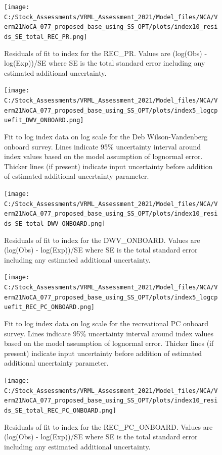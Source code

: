\documentclass[11pt,
  english,
  a4paper,
]{article}
\begin{document}
\begin{figure}
\centering
\texttt{[image: C:/Stock\_Assessments/VRML\_Assessment\_2021/Model\_files/NCA/Verm21NoCA\_077\_proposed\_base\_using\_SS\_OPT/plots/index10\_resids\_SE\_total\_REC\_PR.png]}
\caption{Residuals of fit to index for the REC\_PR. Values are (log(Obs) - log(Exp))/SE where SE is the total standard error including any estimated additional uncertainty.\label{fig:cpue-resid-REC-PR}}
\end{figure}

\begin{figure}
\centering
\texttt{[image: C:/Stock\_Assessments/VRML\_Assessment\_2021/Model\_files/NCA/Verm21NoCA\_077\_proposed\_base\_using\_SS\_OPT/plots/index5\_logcpuefit\_DWV\_ONBOARD.png]}
\caption{Fit to log index data on log scale for the Deb Wilson-Vandenberg onboard survey. Lines indicate 95\% uncertainty interval around index values based on the model assumption of lognormal error. Thicker lines (if present) indicate input uncertainty before addition of estimated additional uncertainty parameter.\label{fig:log-cpue-DWV-ONBOARD}}
\end{figure}

\begin{figure}
\centering
\texttt{[image: C:/Stock\_Assessments/VRML\_Assessment\_2021/Model\_files/NCA/Verm21NoCA\_077\_proposed\_base\_using\_SS\_OPT/plots/index10\_resids\_SE\_total\_DWV\_ONBOARD.png]}
\caption{Residuals of fit to index for the DWV\_ONBOARD. Values are (log(Obs) - log(Exp))/SE where SE is the total standard error including any estimated additional uncertainty.\label{fig:cpue-resid-DWV-ONBOARD}}
\end{figure}

\begin{figure}
\centering
\texttt{[image: C:/Stock\_Assessments/VRML\_Assessment\_2021/Model\_files/NCA/Verm21NoCA\_077\_proposed\_base\_using\_SS\_OPT/plots/index5\_logcpuefit\_REC\_PC\_ONBOARD.png]}
\caption{Fit to log index data on log scale for the recreational PC onboard survey. Lines indicate 95\% uncertainty interval around index values based on the model assumption of lognormal error. Thicker lines (if present) indicate input uncertainty before addition of estimated additional uncertainty parameter.\label{fig:log-cpue-REC-PC-ONBOARD}}
\end{figure}

\begin{figure}
\centering
\texttt{[image: C:/Stock\_Assessments/VRML\_Assessment\_2021/Model\_files/NCA/Verm21NoCA\_077\_proposed\_base\_using\_SS\_OPT/plots/index10\_resids\_SE\_total\_REC\_PC\_ONBOARD.png]}
\caption{Residuals of fit to index for the REC\_PC\_ONBOARD. Values are (log(Obs) - log(Exp))/SE where SE is the total standard error including any estimated additional uncertainty.\label{fig:cpue-resid-REC-PC-ONBOARD}}
\end{figure}
\end{document}
